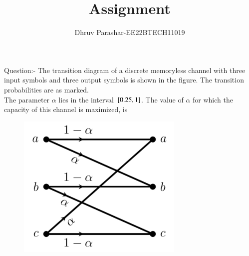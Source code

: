\documentclass[article]{IEEEtran}
\theoremstyle{remark}
\begin{document}
\let\vec\mathbf


\title{
Assignment
}
\author{ Dhruv Parashar-EE22BTECH11019}
\maketitle

\vspace{3cm}
Question:-
The transition diagram of a discrete memoryless channel with three input symbols
and three output symbols is shown in the figure. The transition probabilities are as
marked.\\
The parameter $\alpha$ lies in the interval ${}\left[0.25,1\right]$. The value of $\alpha$ for which the capacity of this channel is maximized, is
\begin{figure}[!ht]
\centering
\includegraphics[width=\columnwidth]{./figs/figure1.png}
\label{Fig:1}
\end{figure}
\solution
\end{document}
